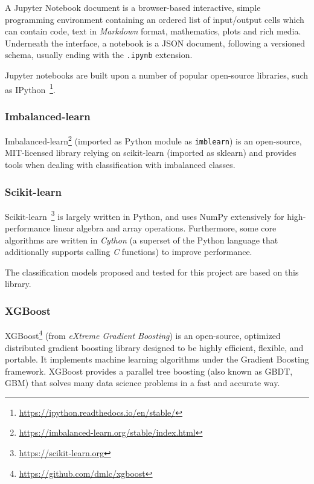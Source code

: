 \documentclass[a4paper, 12pt]{book}
\begin{document}
A Jupyter Notebook document is a browser-based interactive, simple programming environment containing an ordered list of input/output cells which can contain code, text in \emph{Markdown} format, mathematics, plots and rich media. Underneath the interface, a notebook is a JSON document, following a versioned schema, usually ending with the \texttt{.ipynb} extension.

Jupyter notebooks are built upon a number of popular open-source libraries, such as IPython~\footnote{\url{https://ipython.readthedocs.io/en/stable/}}.

\subsubsection{Imbalanced-learn}
\label{sssec:imblearn}

Imbalanced-learn\footnote{\url{https://imbalanced-learn.org/stable/index.html}} (imported as Python module as \texttt{imblearn}) is an open-source, MIT-licensed library relying on scikit-learn (imported as sklearn) and provides tools when dealing with classification with imbalanced classes.

\subsubsection{Scikit-learn}
\label{sssec:scikit-learn}

Scikit-learn~\footnote{\url{https://scikit-learn.org}} is largely written in Python, and uses NumPy extensively for high-performance linear algebra and array operations. Furthermore, some core algorithms are written in \emph{Cython} (a superset of the Python language that additionally supports calling \emph{C} functions) to improve performance.

The classification models proposed and tested for this project are based on this library. 

\subsubsection{XGBoost}
\label{sssec:state-art-xgboost}

XGBoost\footnote{\url{https://github.com/dmlc/xgboost}} (from \textit{eXtreme Gradient Boosting}) is an open-source, optimized distributed gradient boosting library designed to be highly efficient, flexible, and portable. It implements machine learning algorithms under the Gradient Boosting framework. XGBoost provides a parallel tree boosting (also known as GBDT, GBM) that solves many data science problems in a fast and accurate way.
\end{document}

